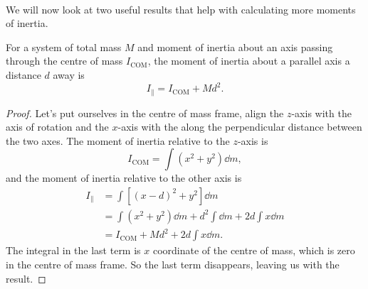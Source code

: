 \documentclass[../classical_mechanics.tex]{subfiles}
\begin{document}
        \paragraph{}
        We will now look at two useful results that help with calculating more moments of inertia.
        \begin{theorem}
            For a system of total mass $M$ and moment of inertia about an axis passing through the centre of mass $I_\text{COM}$, the moment of inertia about a parallel axis a distance $d$ away is
            \begin{equation}
                I_\parallel=I_\text{COM}+Md^2.
            \end{equation}
        \end{theorem}
        \begin{proof}
            Let's put ourselves in the centre of mass frame, align the $z$-axis with the axis of rotation and the $x$-axis with the along the perpendicular distance between the two axes.
            The moment of inertia relative to the $z$-axis is
            \begin{equation}
                I_\text{COM}=\int(x^2+y^2)\dd{m},
            \end{equation}
            and the moment of inertia relative to the other axis is
            \begin{align}
                I_\parallel&=\int[(x-d)^2+y^2]\dd{m}\\
                &=\int(x^2+y^2)\dd{m}+d^2\int\dd{m}+2d\int x\dd{m}\\
                &=I_\text{COM}+Md^2+2d\int x\dd{m}.
            \end{align}
            The integral in the last term is $x$ coordinate of the centre of mass, which is zero in the centre of mass frame.
            So the last term disappears, leaving us with the result.
        \end{proof}
\end{document}
